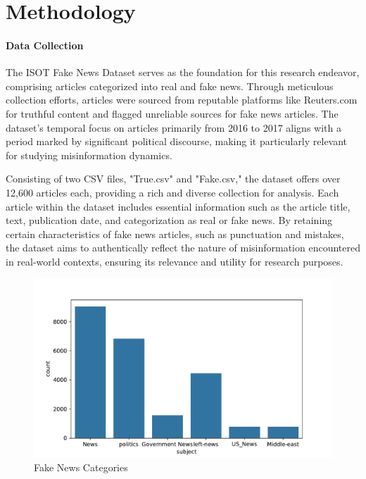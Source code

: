 \chapter{Methodology}
\label{ch:method} %

\subsubsection{Data Collection}

The ISOT Fake News Dataset serves as the foundation for this research endeavor, comprising articles categorized into real and fake news. Through meticulous collection efforts, articles were sourced from reputable platforms like Reuters.com for truthful content and flagged unreliable sources for fake news articles. The dataset's temporal focus on articles primarily from 2016 to 2017 aligns with a period marked by significant political discourse, making it particularly relevant for studying misinformation dynamics.

Consisting of two CSV files, "True.csv" and "Fake.csv," the dataset offers over 12,600 articles each, providing a rich and diverse collection for analysis. Each article within the dataset includes essential information such as the article title, text, publication date, and categorization as real or fake news. By retaining certain characteristics of fake news articles, such as punctuation and mistakes, the dataset aims to authentically reflect the nature of misinformation encountered in real-world contexts, ensuring its relevance and utility for research purposes.

 \begin{figure}

     \centering
     \includegraphics[width=1\linewidth]{figures/FakeNewCategories.pdf}
     \caption{Fake News Categories}
     \label{fig:enter-label}
 \end{figure}

